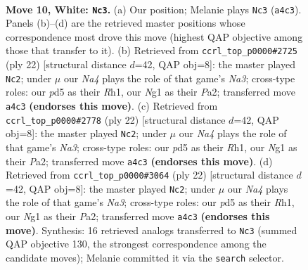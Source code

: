 \documentclass[11pt]{article}
\begin{document}
\clearpage

\begin{figure}[p]\centering
\begin{subfigure}{0.46\textwidth}\centering
\resizebox{\linewidth}{!}{%
\newchessgame
\chessboard[
  setfen={rnbqk2r/p3bp2/2p2p2/1p1p3p/N2P4/4P3/PP3PPP/R2QKBNR w KQkq - 0 10},
  showmover=false,
  pgfstyle=straightmove, color=movearrow, markmove={a4-c3}
]}
\caption{}
\end{subfigure}\hfill
\begin{subfigure}{0.46\textwidth}\centering
\resizebox{\linewidth}{!}{%
\newchessgame
\chessboard[
  setfen={r1bqk2r/5ppp/p1np4/1p1Np1b1/4P3/N1P5/PP3PPP/R2QKB1R w KQkq - 1 12},
  showmover=false,
  pgfstyle=straightmove, color=movearrow, markmove={a3-c2}
]}
\caption{}
\end{subfigure}
\\[4pt]
\begin{subfigure}{0.46\textwidth}\centering
\resizebox{\linewidth}{!}{%
\newchessgame
\chessboard[
  setfen={r1bqk2r/5ppp/p1np4/1p1Np1b1/4P3/N1P5/PP3PPP/R2QKB1R w KQkq - 1 12},
  showmover=false,
  pgfstyle=straightmove, color=movearrow, markmove={a3-c2}
]}
\caption{}
\end{subfigure}\hfill
\begin{subfigure}{0.46\textwidth}\centering
\resizebox{\linewidth}{!}{%
\newchessgame
\chessboard[
  setfen={r1bqk2r/5ppp/p1np4/1p1Np1b1/4P3/N1P5/PP3PPP/R2QKB1R w KQkq - 1 12},
  showmover=false,
  pgfstyle=straightmove, color=movearrow, markmove={a3-c2}
]}
\caption{}
\end{subfigure}
\caption{\textbf{Move 10, White: \texttt{Nc3}.} (a) Our position; Melanie plays \texttt{Nc3} (\texttt{a4c3}). Panels (b)--(d) are the retrieved master positions whose correspondence most drove this move (highest QAP objective among those that transfer to it). (b) Retrieved from \texttt{ccrl\_top\_p0000\#2725} (ply 22) [structural distance $d$=42, QAP obj=8]: the master played \texttt{Nc2}; under $\mu$ our \emph{Na4} plays the role of that game's \emph{Na3}; cross-type roles: our \emph{p}d5 as their \emph{R}h1, our \emph{N}g1 as their \emph{P}a2; transferred move \texttt{a4c3} \textbf{(endorses this move)}. (c) Retrieved from \texttt{ccrl\_top\_p0000\#2778} (ply 22) [structural distance $d$=42, QAP obj=8]: the master played \texttt{Nc2}; under $\mu$ our \emph{Na4} plays the role of that game's \emph{Na3}; cross-type roles: our \emph{p}d5 as their \emph{R}h1, our \emph{N}g1 as their \emph{P}a2; transferred move \texttt{a4c3} \textbf{(endorses this move)}. (d) Retrieved from \texttt{ccrl\_top\_p0000\#3064} (ply 22) [structural distance $d$=42, QAP obj=8]: the master played \texttt{Nc2}; under $\mu$ our \emph{Na4} plays the role of that game's \emph{Na3}; cross-type roles: our \emph{p}d5 as their \emph{R}h1, our \emph{N}g1 as their \emph{P}a2; transferred move \texttt{a4c3} \textbf{(endorses this move)}. Synthesis: 16 retrieved analogs transferred to \texttt{Nc3} (summed QAP objective 130, the strongest correspondence among the candidate moves); Melanie committed it via the \texttt{search} selector.}
\label{fig:thought-m18}
\end{figure}
\end{document}
